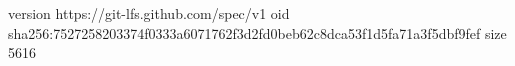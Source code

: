 version https://git-lfs.github.com/spec/v1
oid sha256:7527258203374f0333a6071762f3d2fd0beb62c8dca53f1d5fa71a3f5dbf9fef
size 5616
